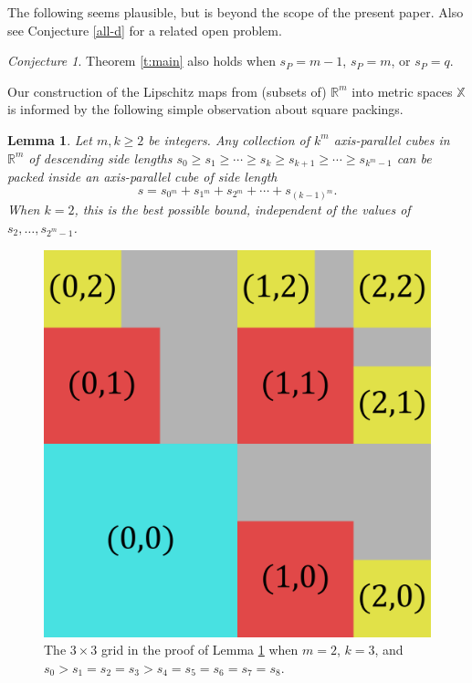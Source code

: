 \documentclass[12pt]{amsart}
\newtheorem{lemma}[theorem]{Lemma}
\theoremstyle{definition}
\theoremstyle{remark}
\newtheorem{conjecture}[theorem]{Conjecture}
\newcommand{\RR}{\mathbb{R}}
\newcommand{\XX}{\mathbb{X}}
\numberwithin{figure}{section}
\numberwithin{equation}{section}
\begin{document}
The following seems plausible, but is beyond the scope of the present paper. Also see Conjecture \ref{all-d} for a related open problem.

\begin{conjecture} Theorem \ref{t:main} also holds when $s_P=m-1$, $s_P=m$, or $s_P=q$.\end{conjecture}

Our construction of the Lipschitz maps from (subsets of) $\RR^m$ into metric spaces $\XX$ is informed by the following simple observation about square packings.

\begin{lemma}\label{root-packing} Let $m,k\geq 2$ be integers. Any collection of $k^m$ axis-parallel cubes in $\RR^m$ of descending side lengths $s_0\geq s_1\geq \cdots \geq s_k\geq s_{k+1}\geq\cdots \geq s_{k^m-1}$ can be packed inside an axis-parallel cube of side length \begin{equation}\label{sum-law} s=s_{0^m}+s_{1^m}+s_{2^m}+\cdots+s_{(k-1)^m}.\end{equation} When $k=2$, this is the best possible bound, independent of the values of $s_2,\dots,s_{2^m-1}$.
\end{lemma}

\begin{figure}\begin{center}\includegraphics[width=.38\textwidth]{grid.png}\end{center}\caption{The $3\times 3$ grid in the proof of Lemma \ref{root-packing} when $m=2$, $k=3$, and $s_0>s_1=s_2=s_3>s_4=s_5=s_6=s_7=s_8$.}\label{fig:grid}\end{figure}
\end{document}
